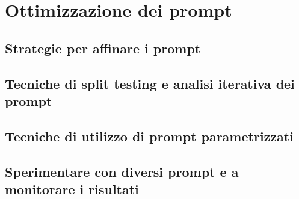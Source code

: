 \section{Ottimizzazione dei prompt}
    \subsection{Strategie per affinare i prompt}
    \subsection{Tecniche di split testing e analisi iterativa dei prompt}
    \subsection{Tecniche di utilizzo di prompt parametrizzati}
    \subsection{Sperimentare con diversi prompt e a monitorare i risultati}
